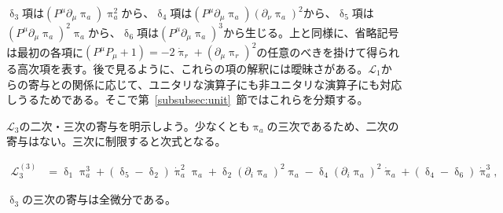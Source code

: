\documentclass[a4paper,11pt]{ltjsarticle}
\numberwithin{equation}{section}
\newcommand{\Sec}[1]{Sec.~\ref{#1}}
\renewcommand{\Sec}[1]{第~\ref{#1}~節}
\begin{document}
$\updelta_3$項は$(P^\mu\partial_\mu\uppi_a)\uppi_a^2$から、$\updelta_4$項は$(P^\mu\partial_\mu\uppi_a)(\partial_\nu\uppi_a)^2$から、$\updelta_5$項は$(P^\mu\partial_\mu\uppi_a)^2\uppi_a$から、$\updelta_6$項は$(P^\mu\partial_\mu\uppi_a)^3$から生じる。上と同様に、省略記号は最初の各項に$(P^\mu P_\mu+1)=-2\dot{\uppi}_r+(\partial_\mu\uppi_r)^2$の任意のべきを掛けて得られる高次項を表す。後で見るように、これらの項の解釈には曖昧さがある。$\mathcal{L}_1$からの寄与との関係に応じて、ユニタリな演算子にも非ユニタリな演算子にも対応しうるためである。そこで\Sec{subsubsec:unit}ではこれらを分類する。

$\mathcal{L}_3$の二次・三次の寄与を明示しよう。少なくとも$\uppi_a$の三次であるため、二次の寄与はない。三次に制限すると次式となる。

\begin{align}
        \mathcal{L}_3^{(3)} &=\updelta_1 \uppi_a^3 + (\updelta_5- \updelta_2)  \dot{\uppi}_{a}^2 \uppi_a  + \updelta_2  (\partial_i \uppi_{a})^2 \uppi_a - \updelta_4  (\partial_i \uppi_{a})^2 \dot{\uppi}_a + (\updelta_4-\updelta_6)\dot{\uppi}_{a}^3 ,
    \end{align}

$\updelta_3$の三次の寄与は全微分である。
\end{document}
